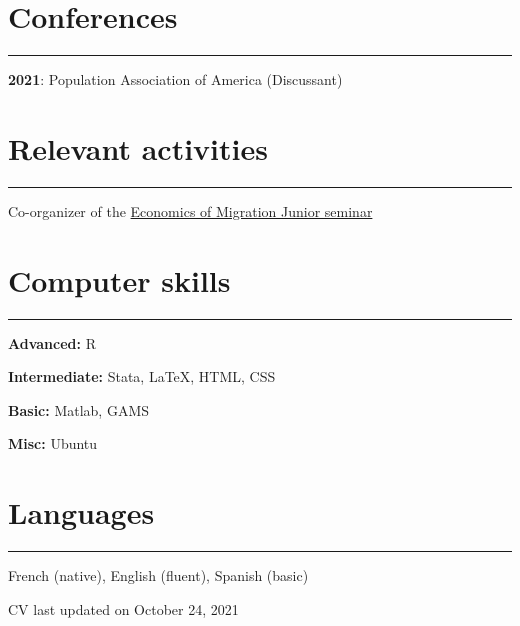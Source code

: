 \documentclass{article}
\newcommand{\sectionline}{%
  \vspace{-0.5cm}%
  \par\noindent\rule{\textwidth}{0.4pt}%
  \vspace{0.3cm}%
}
\let\xsection=\section
\renewcommand{\section}[1]{%
  \vspace{0.4cm}%
  \xsection*{#1}%
  \sectionline%
}
\begin{document}
\hypertarget{conferences}{%
\section{Conferences}\label{conferences}}

\textbf{2021}: Population Association of America (Discussant)

\hypertarget{relevant-activities}{%
\section{Relevant activities}\label{relevant-activities}}

Co-organizer of the
\href{https://sites.google.com/view/the-economics-of-migration}{Economics
of Migration Junior seminar}

\hypertarget{computer-skills}{%
\section{Computer skills}\label{computer-skills}}

\textbf{Advanced:} R

\textbf{Intermediate:} Stata, LaTeX, HTML, CSS

\textbf{Basic:} Matlab, GAMS

\textbf{Misc:} Ubuntu

\hypertarget{languages}{%
\section{Languages}\label{languages}}

French (native), English (fluent), Spanish (basic)

\vspace{2cm}

\begin{center}
CV last updated on October 24, 2021
\end{center}
\end{document}
